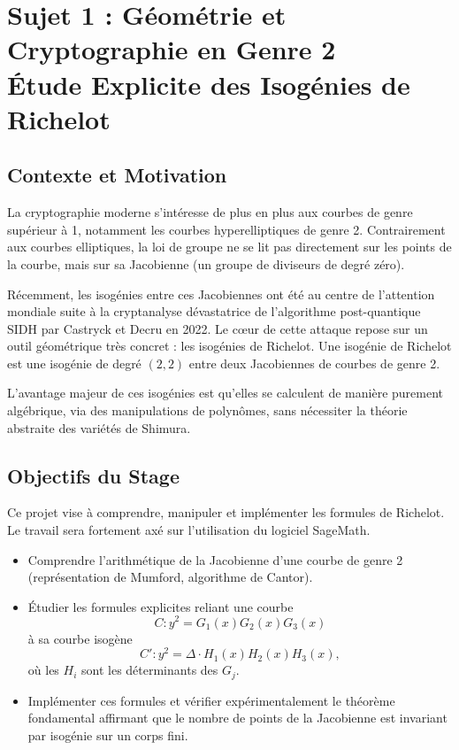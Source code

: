 \documentclass[12pt,a4paper]{article}
\begin{document}
	\tableofcontents
	
	\newpage
	\section{Sujet 1 : Géométrie et Cryptographie en Genre 2\\
		Étude Explicite des Isogénies de Richelot}
	
	\subsection{Contexte et Motivation}
	
	La cryptographie moderne s'intéresse de plus en plus aux courbes de genre supérieur à 1,
	notamment les courbes hyperelliptiques de genre 2. Contrairement aux courbes elliptiques,
	la loi de groupe ne se lit pas directement sur les points de la courbe, mais sur sa Jacobienne
	(un groupe de diviseurs de degré zéro).
	
	Récemment, les isogénies entre ces Jacobiennes ont été au centre de l'attention mondiale
	suite à la cryptanalyse dévastatrice de l'algorithme post-quantique SIDH par Castryck et
	Decru en 2022. Le cœur de cette attaque repose sur un outil géométrique très concret :
	les isogénies de Richelot. Une isogénie de Richelot est une isogénie de degré $(2,2)$ entre
	deux Jacobiennes de courbes de genre 2.
	
	L'avantage majeur de ces isogénies est qu'elles se calculent de manière purement algébrique,
	via des manipulations de polynômes, sans nécessiter la théorie abstraite des variétés de
	Shimura.
	
	\subsection{Objectifs du Stage}
	
	Ce projet vise à comprendre, manipuler et implémenter les formules de Richelot. Le travail
	sera fortement axé sur l'utilisation du logiciel SageMath.
	
	\begin{itemize}
		\item Comprendre l'arithmétique de la Jacobienne d'une courbe de genre 2 (représentation
		de Mumford, algorithme de Cantor).
		
		\item Étudier les formules explicites reliant une courbe
		\[
		C : y^2 = G_1(x)G_2(x)G_3(x)
		\]
		à sa courbe isogène
		\[
		C' : y^2 = \Delta \cdot H_1(x)H_2(x)H_3(x),
		\]
		où les $H_i$ sont les déterminants des $G_j$.
		
		\item Implémenter ces formules et vérifier expérimentalement le théorème fondamental
		affirmant que le nombre de points de la Jacobienne est invariant par isogénie sur un corps fini.
	\end{itemize}
	
\end{document}
